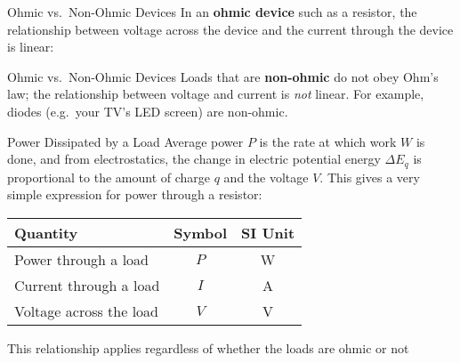 \documentclass[12pt,aspectratio=169]{beamer}
\begin{document}
\begin{frame}{Ohmic vs.\ Non-Ohmic Devices}
  In an \textbf{ohmic device} such as a resistor, the relationship between
  voltage across the device and the current through the device is linear:
  \begin{center}
    \hspace{.15in}
  \end{center}
\end{frame}



\begin{frame}{Ohmic vs.\ Non-Ohmic Devices}
  Loads that are \textbf{non-ohmic} do not obey Ohm's law; the relationship
  between voltage and current is \emph{not} linear. For example, diodes (e.g.\
  your TV's LED screen) are non-ohmic.
  \begin{center}
  \end{center}
\end{frame}



\begin{frame}{Power Dissipated by a Load}
  Average power $P$ is the rate at which work $W$ is done, and from
  electrostatics, the change in electric potential energy $\Delta E_q$ is
  proportional to the amount of charge $q$ and the voltage $V$. This gives a
  very simple expression for power through a resistor:
  
  \begin{center}
    \begin{tabular}{l|c|c}
      \rowcolor{pink}
      \textbf{Quantity} & \textbf{Symbol} & \textbf{SI Unit} \\ \hline
      Power through a load    & $P$ & \si\watt \\
      Current through a load  & $I$ & \si\ampere \\
      Voltage across the load & $V$ & \si\volt
    \end{tabular}
  \end{center}
  This relationship applies regardless of whether the loads are ohmic or not
\end{frame}
\end{document}
